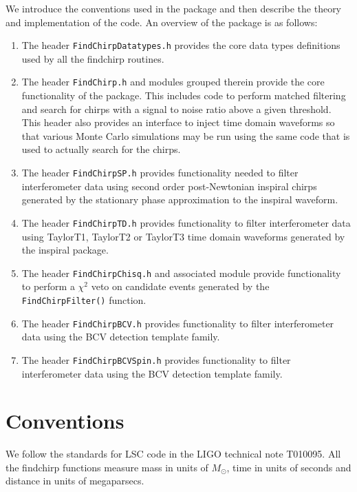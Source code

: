 We introduce the conventions used in the package and then describe the theory
and implementation of the code. An overview of the package is as follows:
\begin{enumerate}
\item The header \texttt{FindChirpDatatypes.h} provides the core data types
definitions used by all the findchirp routines.

\item The header \texttt{FindChirp.h} and modules grouped therein provide the
core functionality of the package. This includes code to perform matched
filtering and search for chirps with a signal to noise ratio above a given
threshold.  This header also provides an interface to inject time domain
waveforms so that various Monte Carlo simulations may be run using the same
code that is used to actually search for the chirps.

\item The header \texttt{FindChirpSP.h} provides functionality needed to
filter interferometer data using second order post-Newtonian inspiral chirps
generated by the stationary phase approximation to the inspiral waveform.

\item The header \texttt{FindChirpTD.h} provides functionality to filter
interferometer data using TaylorT1, TaylorT2 or TaylorT3 time domain waveforms
generated by the inspiral package.

\item The header \texttt{FindChirpChisq.h} and associated module provide
functionality to perform a $\chi^2$ veto on candidate events generated by the
\texttt{FindChirpFilter()} function.

\item The header \texttt{FindChirpBCV.h} provides functionality to filter
interferometer data using the BCV detection template family.

\item The header \texttt{FindChirpBCVSpin.h} provides functionality to filter
interferometer data using the BCV detection template family.

\end{enumerate}

\newpage

\section{Conventions}

We follow the standards for LSC code in the LIGO technical note T010095.  All
the findchirp functions measure mass in units of $M_\odot$, time in units
of seconds and distance in units of megaparsecs.

